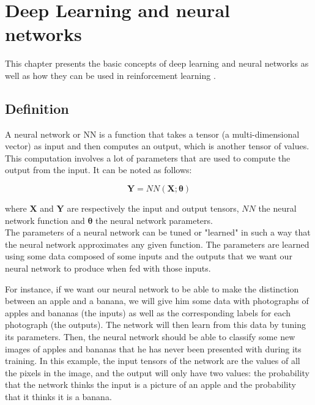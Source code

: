 \chapter{Deep Learning and neural networks}

This chapter presents the basic concepts of deep learning and neural networks as well as how they can be used in reinforcement learning .


\section{Definition}

A neural network or NN  is a function that takes a tensor (a multi-dimensional vector) as input and then computes an output, which is another tensor of values. This computation involves a lot of parameters that are used to compute the output from the input. It can be noted as follows:

\begin{equation} \label{eq:NN simple}
    \mathbf{Y} = NN(\mathbf{X}; \pmb{\theta} )
\end{equation}


where $\mathbf{X}$ and $\mathbf{Y}$ are respectively the input and output tensors, $NN$ the neural network function and $\pmb{\theta}$ the neural network parameters.\\

The parameters of a neural network can be tuned or "learned" in such a way that the neural network approximates any given function. The parameters are learned using some data composed of some inputs and the outputs that we want our neural network to produce when fed with those inputs. 

For instance, if we want our neural network to be able to make the distinction between an apple and a banana, we will give him some data with photographs of apples and bananas (the inputs) as well as the corresponding labels for each photograph (the outputs). The network will then learn from this data by tuning its parameters. Then, the neural network should be able to classify some new images of apples and bananas that he has never been presented with during its training. In this example, the input tensors of the network are the values of all the pixels in the image, and the output will only have two values: the probability that the network thinks the input is a picture of an apple and the probability that it thinks it is a banana.\\

